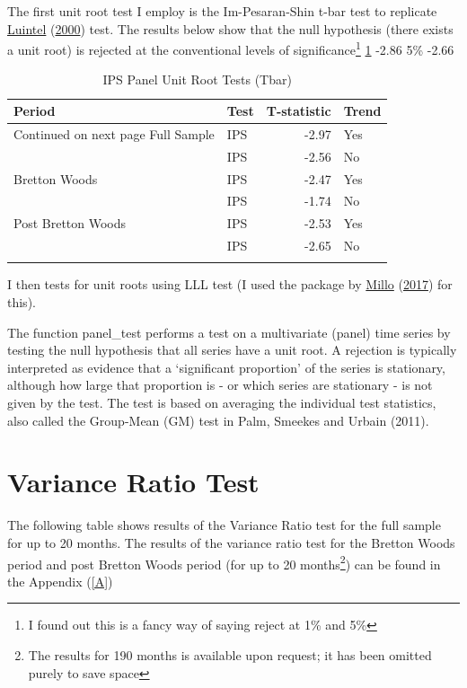 \documentclass[11pt,preprint, authoryear]{elsarticle}
\numberwithin{equation}{section}
\numberwithin{figure}{section}
\numberwithin{table}{section}
\let\rmarkdownfootnote\footnote%
\def\footnote{\protect\rmarkdownfootnote}
\begin{document}
The first unit root test I employ is the Im-Pesaran-Shin t-bar test to
replicate \protect\hyperlink{ref-Kul}{Luintel}
(\protect\hyperlink{ref-Kul}{2000}) test. The results below show that
the null hypothesis (there exists a unit root) is rejected at the
conventional levels of significance\footnote{I found out this is a fancy
  way of saying reject at 1\% and 5\%} \ref{ips} -2.86 5\% -2.66

\begingroup\fontsize{12pt}{13pt}\selectfont
\begin{longtable}{llrl}
\caption{IPS Panel Unit Root Tests (Tbar)} \\ 
  \toprule
Period & Test & T-statistic & Trend \\ 
  \hline 
\endhead 
\hline 
{\footnotesize Continued on next page} 
\endfoot 
\endlastfoot 
 \midrule
Full Sample & IPS & -2.97 & Yes \\ 
   & IPS & -2.56 & No \\ 
  Bretton Woods & IPS & -2.47 & Yes \\ 
   & IPS & -1.74 & No \\ 
  Post Bretton Woods & IPS & -2.53 & Yes \\ 
   & IPS & -2.65 & No \\ 
   \bottomrule
\label{ips}
\end{longtable}
\endgroup

I then tests for unit roots using LLL test (I used the package by
\protect\hyperlink{ref-plm}{Millo} (\protect\hyperlink{ref-plm}{2017})
for this).

The function panel\_test performs a test on a multivariate (panel) time
series by testing the null hypothesis that all series have a unit root.
A rejection is typically interpreted as evidence that a `significant
proportion' of the series is stationary, although how large that
proportion is - or which series are stationary - is not given by the
test. The test is based on averaging the individual test statistics,
also called the Group-Mean (GM) test in Palm, Smeekes and Urbain (2011).

\hypertarget{variance-ratio-test}{%
\section{\texorpdfstring{Variance Ratio Test
\label{Var}}{Variance Ratio Test }}\label{variance-ratio-test}}

The following table shows results of the Variance Ratio test for the
full sample for up to 20 months. The results of the variance ratio test
for the Bretton Woods period and post Bretton Woods period (for up to 20
months\footnote{The results for 190 months is available upon request; it
  has been omitted purely to save space}) can be found in the Appendix
(\ref{A})
\end{document}
